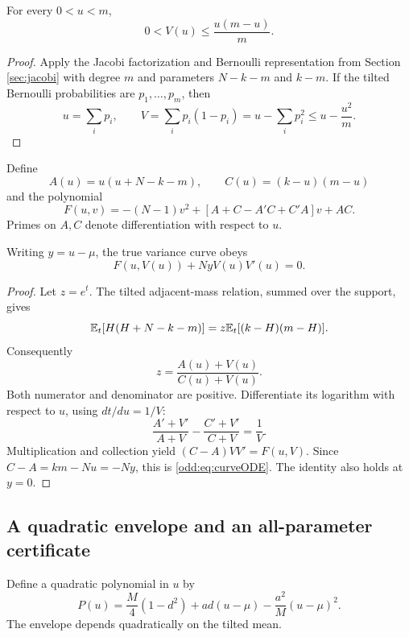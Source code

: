 \begin{lemma}\label{odd:lem:PB}
For every $0<u<m$,
\begin{equation}\label{odd:eq:PB}
 0<V(u)\le\frac{u(m-u)}m.
\end{equation}
\end{lemma}
\begin{proof}
Apply the Jacobi factorization and Bernoulli representation from Section \ref{sec:jacobi} with degree $m$ and parameters $N-k-m$ and $k-m$. If the tilted Bernoulli probabilities are $p_1,\ldots,p_m$, then
\[
 u=\sum_i p_i,\qquad V=\sum_i p_i(1-p_i)
 =u-\sum_i p_i^2\le u-\frac{u^2}{m}.
\]
\end{proof}

Define
\[
 A(u)=u(u+N-k-m),\qquad C(u)=(k-u)(m-u)
\]
and the polynomial
\begin{equation}\label{odd:eq:F}
 F(u,v)=-(N-1)v^2+[A+C-A'C+C'A]v+AC.
\end{equation}
Primes on $A,C$ denote differentiation with respect to $u$.

\begin{lemma}\label{odd:lem:ode}
Writing $y=u-\mu$, the true variance curve obeys
\begin{equation}\label{odd:eq:curveODE}
 F(u,V(u))+NyV(u)V'(u)=0.
\end{equation}
\end{lemma}
\begin{proof}
Let $z=e^t$. The tilted adjacent-mass relation, summed over the support, gives
\[
 \mathbb E_t[H(H+N-k-m)]=z\mathbb E_t[(k-H)(m-H)].
\]
Consequently
\[
 z=\frac{A(u)+V(u)}{C(u)+V(u)}.
\]
Both numerator and denominator are positive. Differentiate its logarithm with respect to $u$, using $dt/du=1/V$:
\[
 \frac{A'+V'}{A+V}-\frac{C'+V'}{C+V}=\frac1V.
\]
Multiplication and collection yield $(C-A)VV'=F(u,V)$. Since $C-A=km-Nu=-Ny$, this is \eqref{odd:eq:curveODE}. The identity also holds at $y=0$.
\end{proof}

\subsection{A quadratic envelope and an all-parameter certificate}
Define a quadratic polynomial in $u$ by
\begin{equation}\label{odd:eq:P}
 P(u)=\frac M4(1-d^2)+ad(u-\mu)-\frac{a^2}{M}(u-\mu)^2.
\end{equation}
The envelope depends quadratically on the tilted mean.

